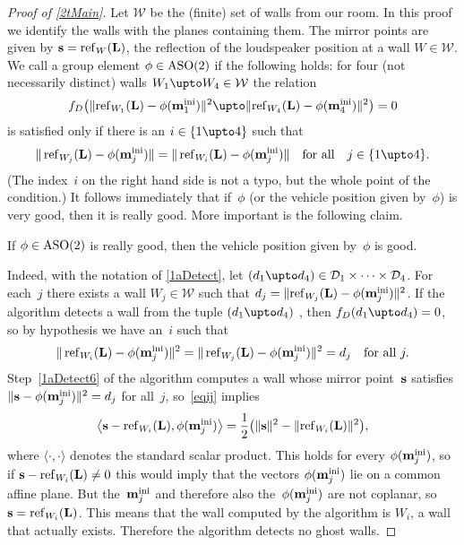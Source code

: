 \documentclass[reqno]{amsart}
\begin{document}
\begin{proof}[Proof of \cref{2tMain}]
  Let $\mathcal W$ be the (finite) set of walls from our room. In this
  proof we identify the walls with the planes containing them. The
  mirror points are given by $\mathbf{s} = \operatorname{ref}_W(\mathbf{L})$, the reflection of
  the loudspeaker position at a wall $W \in \mathcal W$.  We call a
  group element $\phi \in \operatorname{ASO}(2)$  if the following
  holds: for four (not necessarily distinct) walls
  $W_1 \upto W_4 \in \mathcal W$ the relation
  \[
    f_D\bigl(\lVert\re_{W_1}(\ve L) - \phi(\ve m_1^\ini)\rVert^2 \upto
    \lVert\re_{W_4}(\ve L) - \phi(\ve m_4^\ini)\rVert^2\bigr) = 0
  \]
  is satisfied only if there is an $i \in \{1 \upto 4\}$ such that
  \[
    \Vert\re_{W_j}(\ve L) - \phi(\ve m_j^\ini)\rVert =
    \Vert\re_{W_i}(\ve L) - \phi(\ve m_j^\ini)\rVert \quad \text{for
      all} \quad j \in \{1 \upto 4\}.
  \]
  (The index~$i$ on the right hand side is not a typo, but the whole
  point of the condition.) It follows immediately that if~$\phi$ (or
  the vehicle position given by~$\phi$) is very good, then it is
  really good. More important is the following claim.
  \begin{claim} \label{2Claim1}%
    If $\phi \in \operatorname{ASO}(2)$ is really good, then the vehicle position
    given by~$\phi$ is good.
  \end{claim}
  Indeed, with the notation of \cref{1aDetect}, let
  $(d_1 \upto d_4) \in \mathcal D_1 \times \cdots \times \mathcal
  D_4$. For each~$j$ there exists a wall $W_j \in \mathcal W$ such
  that $d_j = \lVert\operatorname{ref}_{W_j}(\mathbf{L}) - \phi(\mathbf{m}_j^{\operatorname{ini}})\rVert^2$. If
  the algorithm detects a wall from the tuple $(d_1 \upto d_4)$ , then
  $f_D(d_1 \upto d_4) = 0$, so by hypothesis we have an~$i$ such that
  \begin{equation} \label{eqij}%
    \Vert\re_{W_i}(\ve L) - \phi(\ve m_j^\ini)\rVert^2 =
    \Vert\re_{W_j}(\ve L) - \phi(\ve m_j^\ini)\rVert^2 = d_j \quad
    \text{for all} \ j.
  \end{equation}
  Step~\ref{1aDetect6} of the algorithm computes a wall whose mirror
  point~$\mathbf{s}$ satisfies
  $\lVert\mathbf{s} - \phi(\mathbf{m}_j^{\operatorname{ini}})\rVert^2 = d_j$ for all~$j$,
  so~\eqref{eqij} implies
  \[
    \bigl\langle\mathbf{s} - \operatorname{ref}_{W_i}(\mathbf{L}),\phi(\mathbf{m}_j^{\operatorname{ini}})\bigr\rangle = \frac{1}{2}\bigl(\lVert\mathbf{s}\rVert^2 -
    \lVert\operatorname{ref}_{W_i}(\mathbf{L})\rVert^2\bigr),
  \]
  where $\langle\cdot,\cdot\rangle$ denotes the standard scalar
  product.
  This holds for every $\phi(\mathbf{m}_j^{\operatorname{ini}})$, so if $\mathbf{s} - \operatorname{ref}_{W_i}(\mathbf{L}) \ne 0$ this would imply that the vectors $\phi(\mathbf{m}_j^{\operatorname{ini}})$ lie on a common affine plane. But the~$\mathbf{m}_j^{\operatorname{ini}}$ and therefore also
  the~$\phi(\mathbf{m}_j^{\operatorname{ini}})$ are not coplanar, so
  $\mathbf{s} = \operatorname{ref}_{W_i}(\mathbf{L})$. This means that the wall computed by the algorithm is
  $W_i$, a wall that actually exists. Therefore the algorithm
  detects no ghost walls.


\end{proof}
\end{document}
